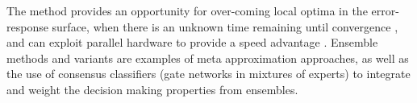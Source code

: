 The method provides an opportunity for over-coming local optima in the error-response surface, when there is an unknown time remaining until convergence \cite{Magdon-ismail2000}, and can exploit parallel hardware to provide a speed advantage \cite{Blas2005}. Ensemble methods and variants are examples of meta approximation approaches, as well as the use of consensus classifiers (gate networks in mixtures of experts) to integrate and weight the decision making properties from ensembles. 

